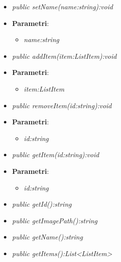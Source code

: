 \begin{itemize}
\begin{itemize}
{\begin{itemize}
			\end{itemize}}
	\item \textit{public setName(name:string):void}\\
	
				\item{\textbf{Parametri}: \begin{itemize}
				\item \textit{name:string}\\

			\end{itemize}}
	\item \textit{public addItem(item:ListItem):void}\\
	
				\item{\textbf{Parametri}: \begin{itemize}
				\item \textit{item:ListItem}\\

			\end{itemize}}
	\item \textit{public removeItem(id:string):void}\\
	
				\item{\textbf{Parametri}: \begin{itemize}
				\item \textit{id:string}\\

			\end{itemize}}
	\item \textit{public getItem(id:string):void}\\
	
				\item{\textbf{Parametri}: \begin{itemize}
				\item \textit{id:string}\\

			\end{itemize}}
	\item \textit{public getId():string}\\
	
	\item \textit{public getImagePath():string}\\
	
	\item \textit{public getName():string}\\
	
	\item \textit{public getItems():List<ListItem>}\\
	

\end{itemize}
\end{itemize}
